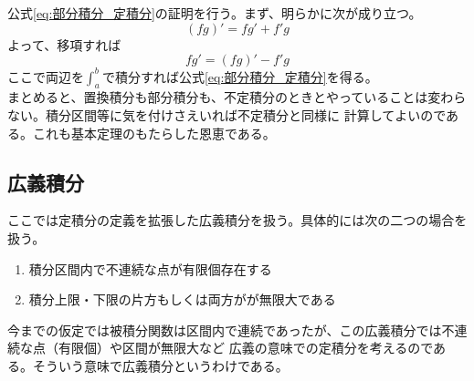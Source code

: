 \documentclass[a4j,dvipdfmx]{jsarticle}
\begin{document}
                    公式\eqref{eq:部分積分_定積分}の証明を行う。まず、明らかに次が成り立つ。
                    \begin{equation*}
                        (fg)' = fg' + f'g
                    \end{equation*}
                    よって、移項すれば
                    \begin{equation*}
                        fg' = (fg)' - f'g
                    \end{equation*}
                    ここで両辺を$\int_a^b$で積分すれば公式\eqref{eq:部分積分_定積分}を得る。\\

                    まとめると、置換積分も部分積分も、不定積分のときとやっていることは変わらない。積分区間等に気を付けさえいれば不定積分と同様に
                    計算してよいのである。これも基本定理のもたらした恩恵である。
            \clearpage
            \subsection{広義積分}
                ここでは定積分の定義を拡張した広義積分を扱う。具体的には次の二つの場合を扱う。
                \begin{enumerate}
                    \item 積分区間内で不連続な点が有限個存在する
                    \item 積分上限・下限の片方もしくは両方がが無限大である
                \end{enumerate}
                今までの仮定では被積分関数は区間内で連続であったが、この広義積分では不連続な点（有限個）や区間が無限大など
                広義の意味での定積分を考えるのである。そういう意味で広義積分というわけである。
\end{document}
